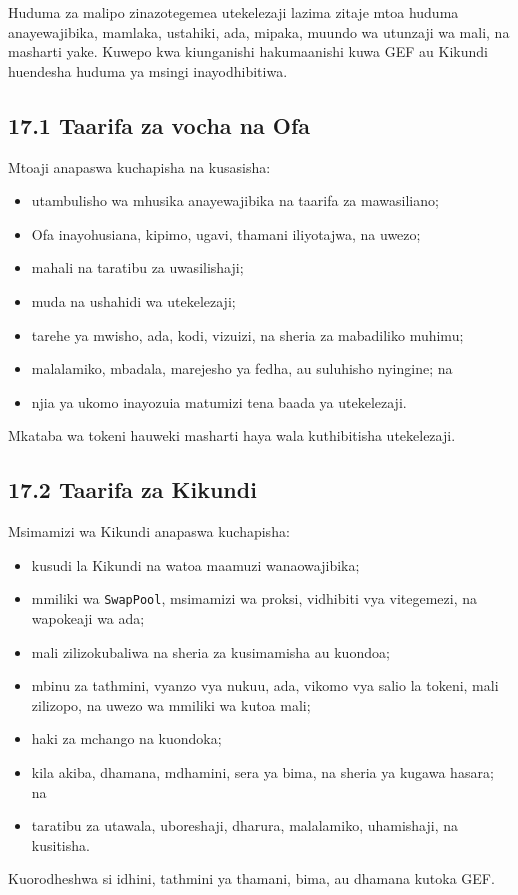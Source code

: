 \documentclass[11pt]{article}
\begin{document}
Huduma za malipo zinazotegemea utekelezaji lazima zitaje mtoa huduma anayewajibika, mamlaka, ustahiki, ada, mipaka, muundo wa utunzaji wa mali, na masharti yake. Kuwepo kwa kiunganishi hakumaanishi kuwa GEF au Kikundi huendesha huduma ya msingi inayodhibitiwa.

\subsection*{17.1 Taarifa za vocha na Ofa}

Mtoaji anapaswa kuchapisha na kusasisha:

\begin{itemize}[leftmargin=*]
\item utambulisho wa mhusika anayewajibika na taarifa za mawasiliano;
\item Ofa inayohusiana, kipimo, ugavi, thamani iliyotajwa, na uwezo;
\item mahali na taratibu za uwasilishaji;
\item muda na ushahidi wa utekelezaji;
\item tarehe ya mwisho, ada, kodi, vizuizi, na sheria za mabadiliko muhimu;
\item malalamiko, mbadala, marejesho ya fedha, au suluhisho nyingine; na
\item njia ya ukomo inayozuia matumizi tena baada ya utekelezaji.
\end{itemize}
Mkataba wa tokeni hauweki masharti haya wala kuthibitisha utekelezaji.

\subsection*{17.2 Taarifa za Kikundi}

Msimamizi wa Kikundi anapaswa kuchapisha:

\begin{itemize}[leftmargin=*]
\item kusudi la Kikundi na watoa maamuzi wanaowajibika;
\item mmiliki wa \texttt{SwapPool}, msimamizi wa proksi, vidhibiti vya vitegemezi, na wapokeaji wa ada;
\item mali zilizokubaliwa na sheria za kusimamisha au kuondoa;
\item mbinu za tathmini, vyanzo vya nukuu, ada, vikomo vya salio la tokeni, mali zilizopo, na uwezo wa mmiliki wa kutoa mali;
\item haki za mchango na kuondoka;
\item kila akiba, dhamana, mdhamini, sera ya bima, na sheria ya kugawa hasara; na
\item taratibu za utawala, uboreshaji, dharura, malalamiko, uhamishaji, na kusitisha.
\end{itemize}
Kuorodheshwa si idhini, tathmini ya thamani, bima, au dhamana kutoka GEF.
\end{document}
